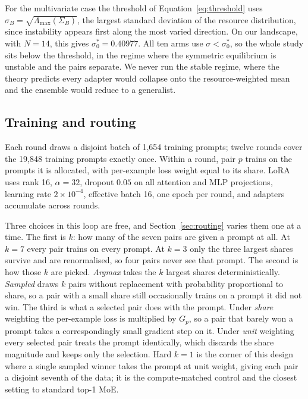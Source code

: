 \documentclass{article}
\begin{document}
For the multivariate case the threshold of Equation~\ref{eq:threshold} uses
$\sigma_B = \sqrt{\Lambda_{\max}(\Sigma_B)}$, the largest standard deviation of the resource
distribution, since instability appears first along the most varied direction. On our landscape, with
$N = 14$, this gives $\sigma_0^* = 0.40977$. All ten arms use $\sigma < \sigma_0^*$, so the whole
study sits below the threshold, in the regime where the symmetric equilibrium is unstable and the
pairs separate. We never run the stable regime, where the theory predicts every adapter would collapse
onto the resource-weighted mean and the ensemble would reduce to a generalist.

\subsection{Training and routing}
Each round draws a disjoint batch of 1{,}654 training prompts; twelve rounds cover the 19{,}848
training prompts exactly once. Within a round, pair $p$ trains on the prompts it is allocated, with
per-example loss weight equal to its share. LoRA uses rank 16, $\alpha=32$, dropout $0.05$ on all
attention and MLP projections, learning rate $2\times10^{-4}$, effective batch 16, one epoch per
round, and adapters accumulate across rounds.

Three choices in this loop are free, and Section~\ref{sec:routing} varies them one at a time. The
first is $k$: how many of the seven pairs are given a prompt at all. At $k=7$ every pair trains on
every prompt. At $k=3$ only the three largest shares survive and are renormalised, so four pairs never
see that prompt. The second is how those $k$ are picked. \emph{Argmax} takes the $k$ largest shares
deterministically. \emph{Sampled} draws $k$ pairs without replacement with probability proportional
to share, so a pair with a small share still occasionally trains on a prompt it did not win. The third
is what a selected pair does with the prompt. Under \emph{share} weighting the per-example loss is
multiplied by $G_p$, so a pair that barely won a prompt takes a correspondingly small gradient step
on it. Under \emph{unit} weighting every selected pair treats the prompt identically, which discards
the share magnitude and keeps only the selection. Hard $k{=}1$ is the corner of this design where a
single sampled winner takes the prompt at unit weight, giving each pair a disjoint seventh of the
data; it is the compute-matched control and the closest setting to standard top-1 MoE.
\end{document}

